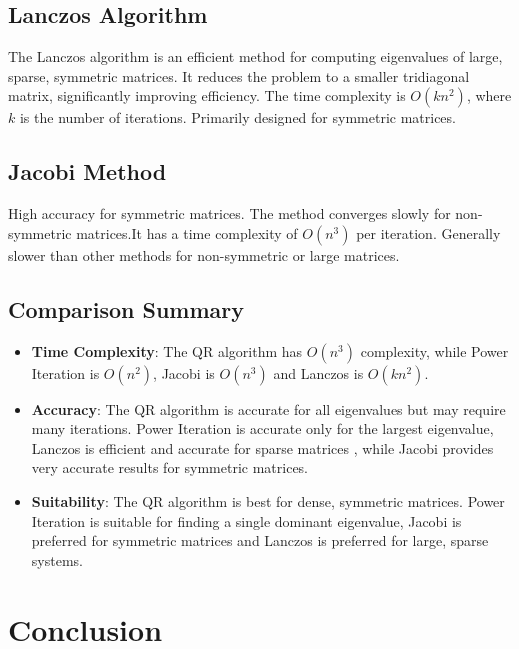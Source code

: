 \documentclass[11pt]{report}
\begin{document}
\subsection{Lanczos Algorithm}
The Lanczos algorithm is an efficient method for computing eigenvalues of large, sparse, symmetric matrices. It reduces the problem to a smaller tridiagonal matrix, significantly improving efficiency. The time complexity is $O(kn^2)$, where $k$ is the number of iterations. Primarily designed for symmetric matrices.

\subsection{Jacobi Method}
High accuracy for symmetric matrices. The method converges slowly for non-symmetric matrices.It has a time complexity of $O(n^3)$ per iteration. Generally slower than other methods for non-symmetric or large matrices.

\subsection{Comparison Summary}
\begin{itemize}
    \item \textbf{Time Complexity}: The QR algorithm has $O(n^3)$ complexity, while Power Iteration is $O(n^2)$, Jacobi is $O(n^3)$ and Lanczos is $O(kn^2)$.
    \item \textbf{Accuracy}: The QR algorithm is accurate for all eigenvalues but may require many iterations. Power Iteration is accurate only for the largest eigenvalue, Lanczos is efficient and accurate for sparse matrices , while Jacobi provides very accurate results for symmetric matrices.
    \item \textbf{Suitability}: The QR algorithm is best for dense, symmetric matrices. Power Iteration is suitable for finding a single dominant eigenvalue, Jacobi is preferred for symmetric matrices and Lanczos is preferred for large, sparse systems.
\end{itemize}

\section{Conclusion}

\end{document}
